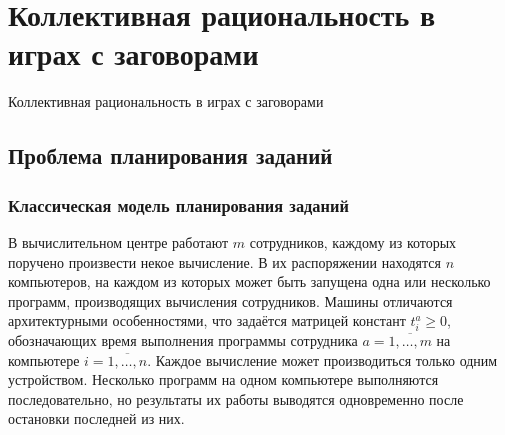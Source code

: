 
\section{Коллективная рациональность в играх с заговорами}

\begin{frame}
    \begin{center}
        \Huge
        Коллективная рациональность в играх с заговорами
    \end{center}
\end{frame}

%
%        

\subsection{Проблема планирования заданий}

\begin{frame}
	\frametitle{Классическая модель планирования заданий}
	В вычислительном центре работают $m$ сотрудников, каждому из которых поручено произвести некое вычисление. В их распоряжении находятся $n$ компьютеров, на каждом из которых может быть запущена одна или несколько программ, производящих вычисления сотрудников. Машины отличаются архитектурными особенностями, что задаётся матрицей констант $t_i^a \ge 0$, обозначающих время выполнения программы сотрудника $a=\overline{1,\ldots,m}$ на компьютере $i=\overline{1,\ldots,n}$. Каждое вычисление может производиться только одним устройством. Несколько программ на одном компьютере выполняются последовательно, но результаты их работы выводятся одновременно после остановки последней из них.
\end{frame}

